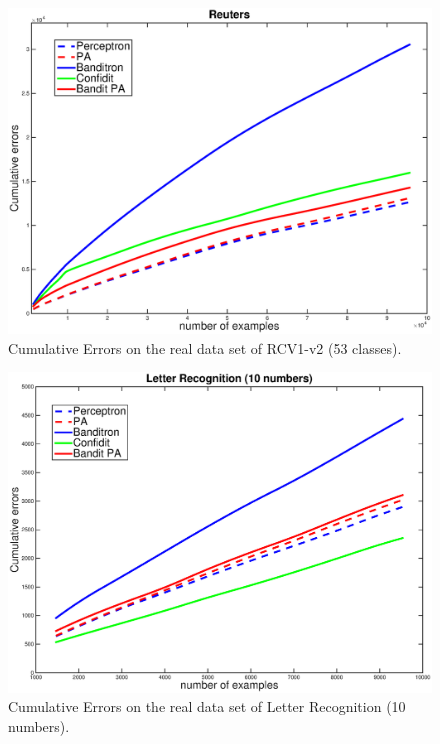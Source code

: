 \documentclass[twocolumn]{article}
\begin{document}
\begin{figure}[h!]
	\centerline{
		\includegraphics[width=\linewidth]{figs/RCV1_v2_53class.eps}}
	\caption{Cumulative Errors  on the real data set of RCV1-v2 (53 classes).}
	\label{pic:BPARCV}
\end{figure}

\begin{figure}[h!]
	\centerline{
		\includegraphics[width=\linewidth]{figs/10LR.eps}}
	\caption{Cumulative Errors on the real data set of Letter Recognition (10 numbers).}
	\label{pic:BPALR10}
\end{figure}
\end{document}
